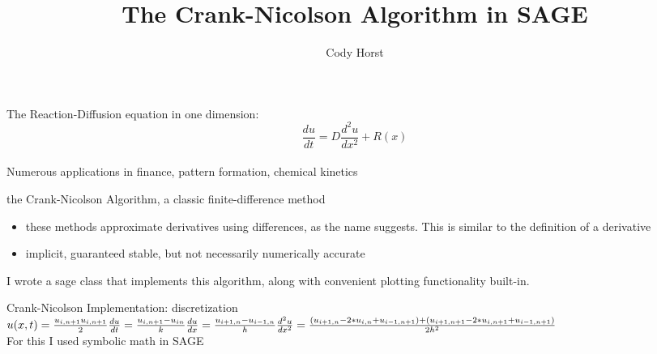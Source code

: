 \documentclass{beamer}
\title{The Crank-Nicolson Algorithm in SAGE}
\author{Cody Horst}\institute{University of Washington}
\begin{document}
\begin{frame}
\titlepage

\end{frame}

\begin{frame}
The Reaction-Diffusion equation in one dimension:
\newline
$$\frac{du}{dt} = D\frac{d^{2}u}{dx^{2}} + R(x) $$\\


Numerous applications in finance, pattern formation, chemical kinetics
    
\end{frame}

\begin{frame}
the Crank-Nicolson Algorithm, a classic finite-difference method

\begin{itemize}
  \item these methods approximate derivatives using differences, as the name suggests. This is similar to the definition of a derivative
  \item implicit, guaranteed stable, but not necessarily numerically accurate
\end{itemize}

I wrote a sage class that implements this algorithm, along with convenient plotting functionality built-in.

\end{frame}

\begin{frame}
Crank-Nicolson Implementation: discretization \newline
$
u(x,t) = \frac{u_{i,n+1} u_{i,n+1}}{2}
\newline
\frac{du}{dt} = \frac{u_{i,n+1} - u_{in}}{k}
\newline
\frac{du}{dx} = \frac{u_{i+1,n} - u_{i-1,n}}{h}
\newline
\frac{d^{2}u}{dx^{2}} = \frac{(u_{i+1,n} - 2*u_{i,n} + u_{i-1,n+1}) + (u_{i+1,n+1} - 2*u_{i,n+1} + u_{i-1,n+1})}{2h^{2}}
$ \\

For this I used symbolic math in SAGE
\end{frame}
\end{document}
